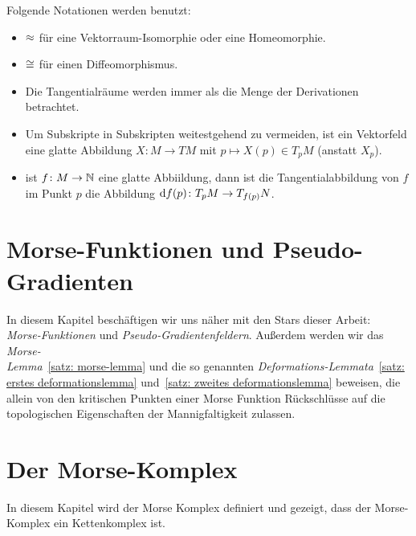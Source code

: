 \documentclass[a4paper,11pt,twoside]{scrreport}
\begin{document}
Folgende Notationen werden benutzt:

\begin{itemize}
    \item $\approx$ für eine Vektorraum-Isomorphie oder eine Homeomorphie.
    \item $\cong$ für einen Diffeomorphismus.
    \item Die Tangentialräume werden immer als die Menge der Derivationen betrachtet.
    \item Um Subskripte in Subskripten weitestgehend zu vermeiden, ist ein Vektorfeld eine 
        glatte Abbildung $X \colon M \to TM$ mit $p \mapsto X(p) \in T_pM$ (anstatt $X_p$).
    \item ist $f \colon M \to { \mathbb N }$ eine glatte Abbiildung, dann ist die Tangentialabbildung
        von $f$ im Punkt $p$ die Abbildung ${ \operatorname{d} } f (p) \colon T_pM \to T_{f(p)}N$.
\end{itemize}

\tableofcontents

\chapter{Morse-Funktionen und Pseudo-Gradienten}

\makeheaderfancy
\setcounter{page}{1}

In diesem Kapitel beschäftigen wir uns näher mit den Stars dieser Arbeit: \\
\textit{Morse-Funktionen} und \textit{Pseudo-Gradientenfeldern}. Außerdem werden wir das 
\textit{Morse-\\Lemma}~\ref{satz: morse-lemma} und die so genannten 
\textit{Deformations-Lemmata}~\ref{satz: erstes deformationslemma} und~\ref{satz: zweites deformationslemma} 
beweisen, die allein von den kritischen Punkten einer Morse Funktion 
Rückschlüsse auf die topologischen Eigenschaften der Mannigfaltigkeit zulassen.






\chapter{Der Morse-Komplex}
In diesem Kapitel wird der Morse Komplex definiert und gezeigt, dass der 
Morse-Komplex ein Kettenkomplex ist.
\end{document}
